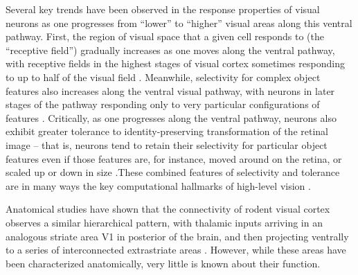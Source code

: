Several key trends have been observed in the response properties of visual neurons as one progresses from ``lower'' to ``higher'' visual areas along this ventral pathway. First, the region of visual space that a given cell responds to (the ``receptive field'') gradually increases as one moves along the ventral pathway, with receptive fields in the highest stages of visual cortex sometimes responding to up to half of the visual field \cite{op2000spatial}. Meanwhile, selectivity for complex object features also increases along the ventral visual pathway, with neurons in later stages of the pathway responding only to very particular configurations of features \cite{Desimone1984, Logothetis1996}.  Critically, as one progresses along the ventral pathway, neurons also exhibit greater tolerance to identity-preserving transformation of the retinal image -- that is, neurons tend to retain their selectivity for particular object features even if those features are, for instance, moved around on the retina, or scaled up or down in size \cite{Ito1995}.These combined features of selectivity and tolerance are in many ways the key computational hallmarks of high-level vision \cite{DiCarlo2007, DiCarlo2012}. 

Anatomical studies have shown that the connectivity of rodent visual cortex observes a similar hierarchical pattern, with thalamic inputs arriving in an analogous striate area V1 in posterior of the brain, and then projecting ventrally to a series of interconnected extrastriate areas  \cite{Coogan1993, ETC}.  However, while these areas have been characterized anatomically, very little is known about their function.


